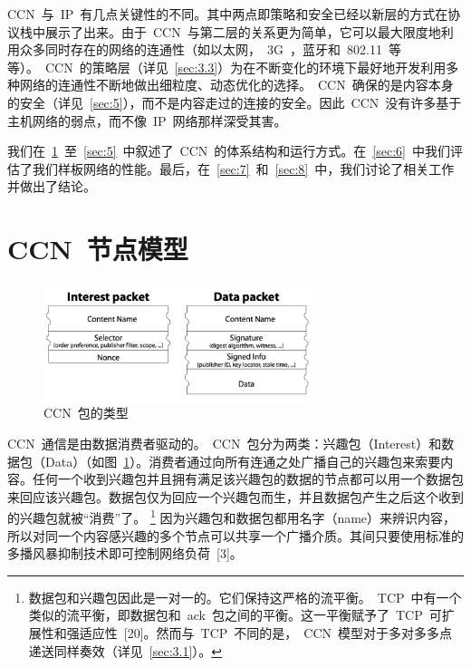 CCN~与~IP~有几点关键性的不同。其中两点即策略和安全已经以新层的方式在协议栈中展示了出来。由于~CCN~与第二层的关系更为简单，它可以最大限度地利用众多同时存在的网络的连通性（如以太网，~3G~，蓝牙和~802.11~等等）。~CCN~的策略层（详见~\ref{sec:3.3}）为在不断变化的环境下最好地开发利用多种网络的连通性不断地做出细粒度、动态优化的选择。~CCN~确保的是内容本身的安全（详见~\ref{sec:5}），而不是内容走过的连接的安全。因此~CCN~没有许多基于主机网络的弱点，而不像~IP~网络那样深受其害。

我们在~\ref{sec:2}~至~\ref{sec:5}~中叙述了~CCN~的体系结构和运行方式。在~\ref{sec:6}~中我们评估了我们样板网络的性能。最后，在~\ref{sec:7}~和~\ref{sec:8}~中，我们讨论了相关工作并做出了结论。



\section{CCN~节点模型}
\label{sec:2}

\begin{figure}[htbp]
  \centering
  \includegraphics[width=0.7\textwidth]{images/packet_types}
  \caption{CCN~包的类型} 
  \label{packet_types}
\end{figure}

CCN~通信是由数据消费者驱动的。~CCN~包分为两类：兴趣包（Interest）和数据包（Data）（如图~\ref{packet_types}）。消费者通过向所有连通之处广播自己的兴趣包来索要内容。任何一个收到兴趣包并且拥有满足该兴趣包的数据的节点都可以用一个数据包来回应该兴趣包。数据包仅为回应一个兴趣包而生，并且数据包产生之后这个收到的兴趣包就被“消费”了。
\renewcommand\baselinestretch{1} %
\footnote{数据包和兴趣包因此是一对一的。它们保持这严格的流平衡。~TCP~中有一个类似的流平衡，即数据包和~ack~包之间的平衡。这一平衡赋予了~TCP~可扩展性和强适应性~[20]。然而与~TCP~不同的是，~CCN~模型对于多对多多点递送同样奏效（详见~\ref{sec:3.1}）。}
因为兴趣包和数据包都用名字（name）来辨识内容，所以对同一个内容感兴趣的多个节点可以共享一个广播介质。其间只要使用标准的多播风暴抑制技术即可控制网络负荷~[3]。%

